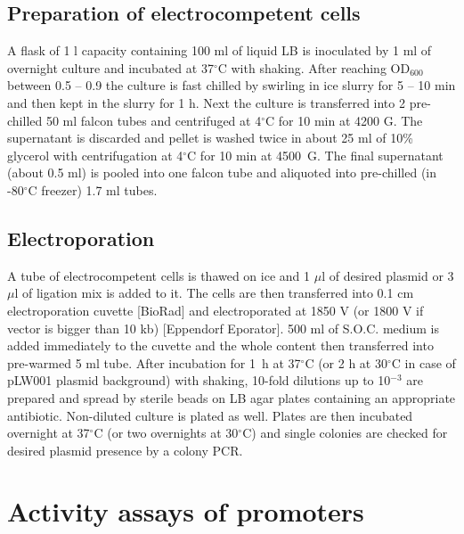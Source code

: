 \subsection{Preparation of electrocompetent cells}
A flask of 1 l capacity containing 100 ml of liquid LB is inoculated by 1 ml of overnight culture and incubated at 37$^{\circ}$C with shaking.
After reaching OD$_{600}$ between 0.5 -- 0.9 the culture is fast chilled by swirling in ice slurry for 5 -- 10 min and then kept in the slurry for 1 h.
Next the culture is transferred into 2 pre-chilled 50 ml falcon tubes and centrifuged at 4$^{\circ}$C for 10 min at 4200 G.
The supernatant is discarded and pellet is washed twice in about 25 ml of 10\% glycerol with centrifugation at 4$^{\circ}$C for 10 min at 4500~G.
The final supernatant (about 0.5 ml) is pooled into one falcon tube and aliquoted into pre-chilled (in -80$^{\circ}$C freezer) 1.7 ml tubes.

\subsection{Electroporation}
A tube of electrocompetent cells is thawed on ice and 1 $\mu$l of desired plasmid or 3 $\mu$l of ligation mix is added to it.
The cells are then transferred into 0.1 cm electroporation cuvette [BioRad] and electroporated at 1850 V (or 1800 V if vector is bigger than 10 kb) [Eppendorf Eporator\textsuperscript{\textregistered}].
500 ml of S.O.C. medium is added immediately to the cuvette and the whole content then transferred into pre-warmed 5 ml tube.
After incubation for 1~h at 37$^{\circ}$C (or 2 h at 30$^{\circ}$C in case of pLW001 plasmid background) with shaking, 10-fold dilutions up to 10$^{-3}$ are prepared and spread by sterile beads on LB agar plates containing an appropriate antibiotic.
Non-diluted culture is plated as well.
Plates are then incubated overnight at 37$^{\circ}$C (or two overnights at 30$^{\circ}$C) and single colonies are checked for desired plasmid presence by a colony PCR.


\hypertarget{FC}{\section{Activity assays of promoters}}
